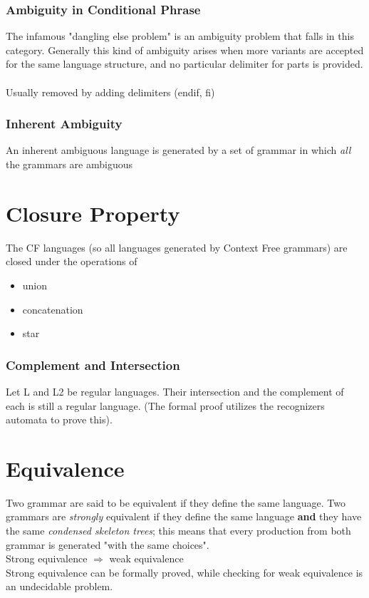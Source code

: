 			\subsubsection{Ambiguity in Conditional Phrase}
				The infamous "dangling else problem" is an ambiguity problem that falls in this category. Generally this kind of ambiguity arises when more variants are accepted for the same language structure, and no particular delimiter for parts is provided.\\\\
				Usually removed by adding delimiters (endif, fi)\\
			\subsubsection{Inherent Ambiguity}
				An inherent ambiguous language is generated by a set of grammar in which \emph{all} the grammars are ambiguous\\					
	
	\section{Closure Property}
		The CF languages (so all languages generated by Context Free grammars) are closed under the operations of
		\begin{itemize}
			\item union
			\item concatenation
			\item star
		\end{itemize}
		
		\subsubsection{Complement and Intersection}
			Let L and L2 be regular languages. Their intersection and the complement of each is still a regular language. (The formal proof utilizes the recognizers automata to prove this).
	
	\section{Equivalence}
		Two grammar are said to be equivalent if they define the same language. Two grammars are \emph{strongly} equivalent if they define the same language \textbf{and} they have the same \emph{condensed skeleton trees}; this means that every production from both grammar is generated "with the same choices".\\
		Strong equivalence $\Rightarrow$ weak equivalence\\
		Strong equivalence can be formally proved, while checking for weak equivalence is an undecidable problem.\\
